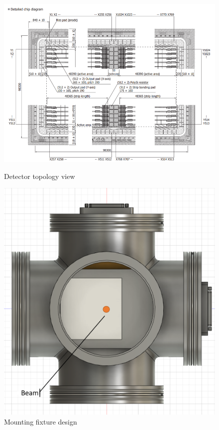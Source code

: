 \documentclass[a4paper]{jpconf}
\begin{document}
\begin{figure}[htbp]
	\begin{minipage}{18pc}
		\includegraphics[width=\textwidth]{topology.png}
		\caption{\label{fig:5} Detector topology view}
	\end{minipage}\hspace{2pc}
	\begin{minipage}{13pc}
		\includegraphics[width=\textwidth]{fixture_offset.png}
		\caption{\label{fig:6} Mounting fixture design}
	\end{minipage} 
\end{figure}
\end{document}
